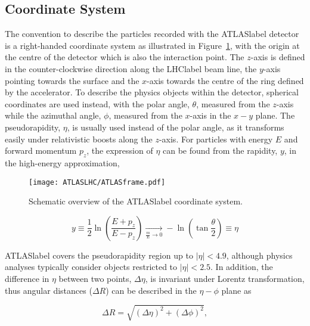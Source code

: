 \subsection{Coordinate System}

The convention to describe the particles recorded with the \acrshort{ATLASlabel} detector is a right-handed coordinate system as illustrated in Figure~\ref{figLHC:ATLASframe}, with the origin at the centre of the detector which is also the interaction point. The $z$-axis is defined in the counter-clockwise direction along the \acrshort{LHClabel} beam line, the $y$-axis pointing towards the surface and the $x$-axis towards the centre of the ring defined by the accelerator. To describe the physics objects within the detector, spherical coordinates are used instead, with the polar angle, $\theta$, measured from the $z$-axis while the azimuthal angle, $\phi$, measured from the $x$-axis in the $x-y$ plane. The pseudorapidity, $\eta$, is usually used instead of the polar angle, as it transforms easily under relativistic boosts along the $z$-axis. For particles with energy $E$ and forward momentum $p_z$, the expression of $\eta$ can be found from the rapidity, $y$, in the high-energy approximation,

\begin{figure}[htbp]
    \RawFloats
    \begin{center}
    \texttt{[image: ATLASLHC/ATLASframe.pdf]}
    \caption{
        Schematic overview of the \acrshort{ATLASlabel} coordinate system. 
    }
    \label{figLHC:ATLASframe}
    \end{center}
\end{figure}

\begin{equation}
   y \equiv \frac{1}{2}\ln\left(\frac{E+p_z}{E-p_z}\right) \xrightarrow[ \frac{m}{E} \to 0]{} -\ln\left(\tan\frac{\theta}{2}\right)\equiv \eta
\end{equation}

\acrshort{ATLASlabel} covers the pseudorapidity region up to $|\eta|<4.9$, although physics analyses
typically consider objects restricted to $|\eta|<2.5$. In addition, the difference in $\eta$ between two points, $\Delta\eta$, is invariant under Lorentz transformation, thus angular distances ($\Delta R$) can be described in the $\eta-\phi$ plane as

\begin{equation}
    \Delta R = \sqrt{\left(\Delta\eta\right)^2+\left(\Delta\phi\right)^2},
\end{equation}

